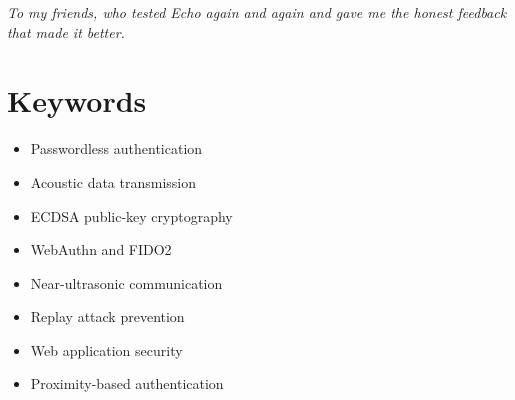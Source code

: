 \vspace{2cm}
\begin{center}
\textit{To my friends, who tested Echo again and again and gave me the honest feedback that made it better.}
\end{center}

\clearpage

\chapter*{Keywords}

\begin{itemize}[nosep]
\item Passwordless authentication
\item Acoustic data transmission
\item ECDSA public-key cryptography
\item WebAuthn and FIDO2
\item Near-ultrasonic communication
\item Replay attack prevention
\item Web application security
\item Proximity-based authentication
\end{itemize}

\clearpage
